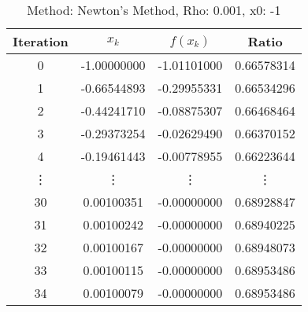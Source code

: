 \begin{table}
\centering
\caption{Method: Newton's Method, Rho: 0.001, x0: -1}
\label{tab:table_Newton's_Method_0_001_-1}
\begin{tabular}{c c c c}
\toprule
Iteration &       $x_k$ &    $f(x_k)$ &      Ratio \\
\midrule
        0 & -1.00000000 & -1.01101000 & 0.66578314 \\
        1 & -0.66544893 & -0.29955331 & 0.66534296 \\
        2 & -0.44241710 & -0.08875307 & 0.66468464 \\
        3 & -0.29373254 & -0.02629490 & 0.66370152 \\
        4 & -0.19461443 & -0.00778955 & 0.66223644 \\
   \vdots &      \vdots &      \vdots &     \vdots \\
       30 &  0.00100351 & -0.00000000 & 0.68928847 \\
       31 &  0.00100242 & -0.00000000 & 0.68940225 \\
       32 &  0.00100167 & -0.00000000 & 0.68948073 \\
       33 &  0.00100115 & -0.00000000 & 0.68953486 \\
       34 &  0.00100079 & -0.00000000 & 0.68953486 \\
\bottomrule
\end{tabular}
\end{table}
